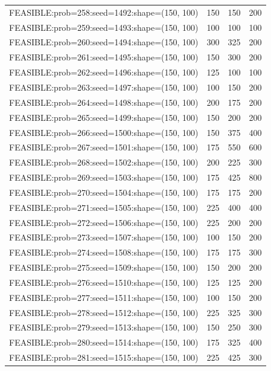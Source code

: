 \begin{longtable}{lccc}
FEASIBLE:prob=258:seed=1492:shape=(150, 100) &  150 &   150 &    200 \\
FEASIBLE:prob=259:seed=1493:shape=(150, 100) &  100 &   100 &    100 \\
FEASIBLE:prob=260:seed=1494:shape=(150, 100) &  300 &   325 &    200 \\
FEASIBLE:prob=261:seed=1495:shape=(150, 100) &  150 &   300 &    200 \\
FEASIBLE:prob=262:seed=1496:shape=(150, 100) &  125 &   100 &    100 \\
FEASIBLE:prob=263:seed=1497:shape=(150, 100) &  100 &   150 &    200 \\
FEASIBLE:prob=264:seed=1498:shape=(150, 100) &  200 &   175 &    200 \\
FEASIBLE:prob=265:seed=1499:shape=(150, 100) &  150 &   200 &    200 \\
FEASIBLE:prob=266:seed=1500:shape=(150, 100) &  150 &   375 &    400 \\
FEASIBLE:prob=267:seed=1501:shape=(150, 100) &  175 &   550 &    600 \\
FEASIBLE:prob=268:seed=1502:shape=(150, 100) &  200 &   225 &    300 \\
FEASIBLE:prob=269:seed=1503:shape=(150, 100) &  175 &   425 &    800 \\
FEASIBLE:prob=270:seed=1504:shape=(150, 100) &  175 &   175 &    200 \\
FEASIBLE:prob=271:seed=1505:shape=(150, 100) &  225 &   400 &    400 \\
FEASIBLE:prob=272:seed=1506:shape=(150, 100) &  225 &   200 &    200 \\
FEASIBLE:prob=273:seed=1507:shape=(150, 100) &  100 &   150 &    200 \\
FEASIBLE:prob=274:seed=1508:shape=(150, 100) &  175 &   175 &    300 \\
FEASIBLE:prob=275:seed=1509:shape=(150, 100) &  150 &   200 &    200 \\
FEASIBLE:prob=276:seed=1510:shape=(150, 100) &  125 &   125 &    200 \\
FEASIBLE:prob=277:seed=1511:shape=(150, 100) &  100 &   150 &    200 \\
FEASIBLE:prob=278:seed=1512:shape=(150, 100) &  225 &   325 &    300 \\
FEASIBLE:prob=279:seed=1513:shape=(150, 100) &  150 &   250 &    300 \\
FEASIBLE:prob=280:seed=1514:shape=(150, 100) &  175 &   325 &    400 \\
FEASIBLE:prob=281:seed=1515:shape=(150, 100) &  225 &   425 &    300 \\

\end{longtable}
